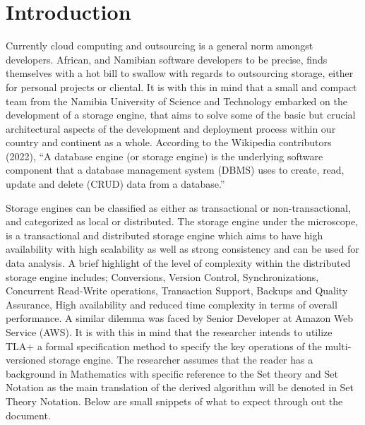 \documentclass[11pt,a4paper,oneside]{book} %
\numberwithin{equation}{section}
\begin{document}
\section{Introduction}
Currently cloud computing and outsourcing is a general norm amongst developers. African,
and Namibian software developers to be precise, finds themselves with a hot bill to swallow with
regards to outsourcing storage, either for personal projects or cliental. It is with this in mind
that a small and compact team from the Namibia University of Science and
Technology embarked on the development of a storage engine, that aims to solve some of the basic but crucial architectural aspects of the development and deployment process within our country and continent as a whole.
According to the Wikipedia contributors (2022), “A database engine (or storage engine) is the
underlying software component that a database management system (DBMS) uses to create,
read, update and delete (CRUD) data from a database.” 

\setlength{\parskip}{10pt}

Storage engines can be classified as
either as transactional or non-transactional, and categorized as local or distributed. The storage engine under the microscope, is a transactional and distributed storage engine which aims to have high availability with high scalability as well as strong consistency and can be used for data analysis. A brief highlight of the level of complexity within the distributed storage engine includes; Conversions, Version Control, Synchronizations, Concurrent Read-Write operations, Transaction Support, Backups and Quality Assurance, High availability and reduced time complexity in terms of overall performance. A similar dilemma was faced by Senior Developer
at Amazon Web Service (AWS). It is with this in mind that the researcher intends to utilize TLA+ a formal specification method to specify the key operations of the multi-versioned storage engine.
The researcher assumes that the reader has a background in Mathematics with specific reference to the Set theory and Set Notation as the main translation of the derived algorithm will be denoted in Set Theory Notation. Below are small snippets of what to expect through out the document.
\end{document}
